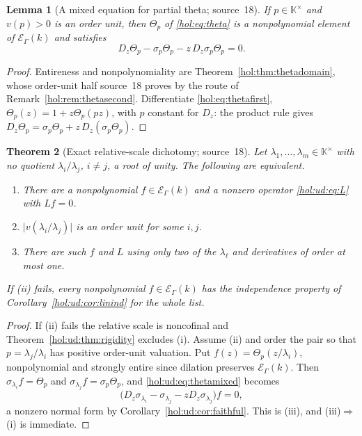 \documentclass[11pt]{article}
\numberwithin{equation}{section}
\newtheorem{theorem}{Theorem}[section]
\newtheorem{lemma}[theorem]{Lemma}
\theoremstyle{definition}
\theoremstyle{remark}
\newcommand{\abs}[1]{\lvert#1\rvert}
\newcommand{\KK}{\mathbb K}
\newcommand{\EK}{\mathcal E_\Gamma(k)}
\begin{document}
\begin{lemma}[A mixed equation for partial theta; source~18]
\label{hol:ud:lem:theta}
If $p\in\KK^\times$ and $v(p)>0$ is an order unit, then $\Theta_p$ of
\eqref{hol:eq:theta} is a nonpolynomial element of $\EK$ and satisfies
\begin{equation}\label{hol:ud:eq:thetamixed}
 D_z\Theta_p-\sigma_p\Theta_p-z\,D_z\sigma_p\Theta_p=0 .
\end{equation}
\end{lemma}

\begin{proof}
Entireness and nonpolynomiality are Theorem~\ref{hol:thm:thetadomain}, whose
order-unit half source~18 proves by the route of
Remark~\ref{hol:rem:thetasecond}. Differentiate \eqref{hol:eq:thetafirst},
$\Theta_p(z)=1+z\Theta_p(pz)$, with $p$ constant for $D_z$: the product rule
gives $D_z\Theta_p=\sigma_p\Theta_p+z\,D_z(\sigma_p\Theta_p)$.
\end{proof}

\begin{theorem}[Exact relative-scale dichotomy; source~18]
\label{hol:ud:thm:dichotomy}
Let $\lambda_1,\ldots,\lambda_m\in\KK^\times$ with no quotient
$\lambda_i/\lambda_j$, $i\ne j$, a root of unity. The following are
equivalent.
\begin{enumerate}[label=\textup{(\roman*)}]
\item There are a nonpolynomial $f\in\EK$ and a nonzero operator
\eqref{hol:ud:eq:L} with $Lf=0$.
\item $\abs{v(\lambda_i/\lambda_j)}$ is an order unit for some $i,j$.
\item There are such $f$ and $L$ using only two of the $\lambda_\ell$ and
derivatives of order at most one.
\end{enumerate}
If \textup{(ii)} fails, every nonpolynomial $f\in\EK$ has the independence
property of Corollary~\ref{hol:ud:cor:linind} for the whole list.
\end{theorem}

\begin{proof}
If (ii) fails the relative scale is noncofinal and
Theorem~\ref{hol:ud:thm:rigidity} excludes (i). Assume (ii) and order the pair
so that $p=\lambda_j/\lambda_i$ has positive order-unit valuation. Put
$f(z)=\Theta_p(z/\lambda_i)$, nonpolynomial and strongly entire since
dilation preserves $\EK$. Then $\sigma_{\lambda_i}f=\Theta_p$ and
$\sigma_{\lambda_j}f=\sigma_p\Theta_p$, and \eqref{hol:ud:eq:thetamixed} becomes
\begin{equation}\label{hol:ud:eq:twoprescribed}
 \bigl(D_z\sigma_{\lambda_i}-\sigma_{\lambda_j}-zD_z\sigma_{\lambda_j}\bigr)f=0,
\end{equation}
a nonzero normal form by Corollary~\ref{hol:ud:cor:faithful}. This is (iii),
and (iii)$\Rightarrow$(i) is immediate.
\end{proof}
\end{document}
